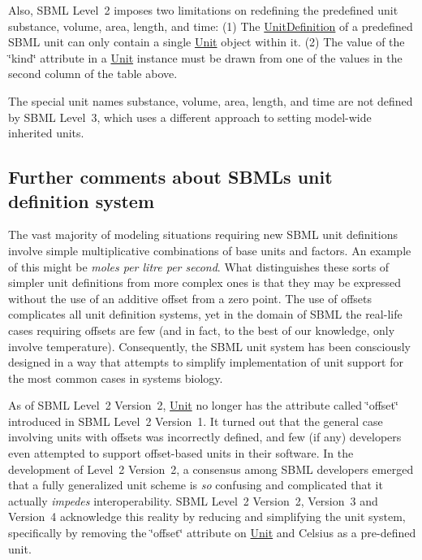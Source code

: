 \begin{DoxyItemize}
Also, S\+B\+ML Level~2 imposes two limitations on redefining the predefined unit {\ttfamily substance}, {\ttfamily volume}, {\ttfamily area}, {\ttfamily length}, and {\ttfamily time\+:} (1) The \hyperlink{class_unit_definition}{Unit\+Definition} of a predefined S\+B\+ML unit can only contain a single \hyperlink{class_unit}{Unit} object within it. (2) The value of the \char`\"{}kind\char`\"{} attribute in a \hyperlink{class_unit}{Unit} instance must be drawn from one of the values in the second column of the table above.

The special unit names {\ttfamily substance}, {\ttfamily volume}, {\ttfamily area}, {\ttfamily length}, and {\ttfamily time} are not defined by S\+B\+ML Level~3, which uses a different approach to setting model-\/wide inherited units.


\end{DoxyItemize}\hypertarget{class_unit_definition_sbml-units-limits}{}\subsection{Further comments about S\+B\+M\+L\textquotesingle{}s unit definition system}\label{class_unit_definition_sbml-units-limits}
The vast majority of modeling situations requiring new S\+B\+ML unit definitions involve simple multiplicative combinations of base units and factors. An example of this might be {\itshape moles per litre per second}. What distinguishes these sorts of simpler unit definitions from more complex ones is that they may be expressed without the use of an additive offset from a zero point. The use of offsets complicates all unit definition systems, yet in the domain of S\+B\+ML the real-\/life cases requiring offsets are few (and in fact, to the best of our knowledge, only involve temperature). Consequently, the S\+B\+ML unit system has been consciously designed in a way that attempts to simplify implementation of unit support for the most common cases in systems biology.

As of S\+B\+ML Level~2 Version~2, \hyperlink{class_unit}{Unit} no longer has the attribute called \char`\"{}offset\char`\"{} introduced in S\+B\+ML Level~2 Version~1. It turned out that the general case involving units with offsets was incorrectly defined, and few (if any) developers even attempted to support offset-\/based units in their software. In the development of Level~2 Version~2, a consensus among S\+B\+ML developers emerged that a fully generalized unit scheme is {\itshape so} confusing and complicated that it actually {\itshape impedes} interoperability. S\+B\+ML Level~2 Version~2, Version~3 and Version~4 acknowledge this reality by reducing and simplifying the unit system, specifically by removing the \char`\"{}offset\char`\"{} attribute on \hyperlink{class_unit}{Unit} and {\ttfamily Celsius} as a pre-\/defined unit.


